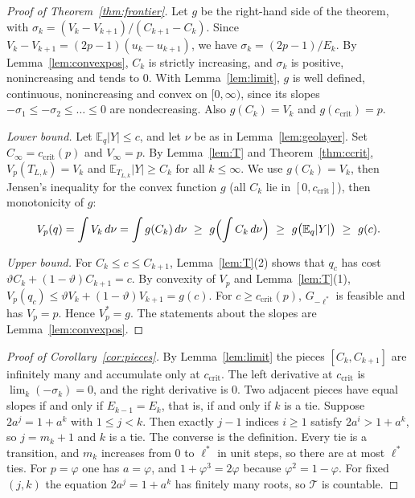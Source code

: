 \documentclass{article}
\theoremstyle{definition}
\theoremstyle{remark}
\newcommand{\E}{\mathbb{E}}
\newcommand{\ccrit}{c_{\mathrm{crit}}}
\begin{document}
\begin{proof}[Proof of Theorem~\ref{thm:frontier}]
Let \(g\) be the right-hand side of the theorem, with \(\sigma_k=(V_k-V_{k+1})/(C_{k+1}-C_k)\). Since \(V_k-V_{k+1}=(2p-1)(u_k-u_{k+1})\), we have \(\sigma_k=(2p-1)/E_k\). By Lemma~\ref{lem:convexpos}, \(C_k\) is strictly increasing, and \(\sigma_k\) is positive, nonincreasing and tends to \(0\). With Lemma~\ref{lem:limit}, \(g\) is well defined, continuous, nonincreasing and convex on \([0,\infty)\), since its slopes \(-\sigma_1\le-\sigma_2\le\dots\le0\) are nondecreasing. Also \(g(C_k)=V_k\) and \(g(\ccrit)=p\).

\emph{Lower bound.} Let \(\E_q|Y|\le c\), and let \(\nu\) be as in Lemma~\ref{lem:geolayer}. Set \(C_\infty=\ccrit(p)\) and \(V_\infty=p\). By Lemma~\ref{lem:T} and Theorem~\ref{thm:ccrit}, \(V_p(T_{L,k})=V_k\) and \(\E_{T_{L,k}}|Y|\ge C_k\) for all \(k\le\infty\). We use \(g(C_k)=V_k\), then Jensen's inequality for the convex function \(g\) (all \(C_k\) lie in \([0,\ccrit]\)), then monotonicity of \(g\):
\[
V_p(q)=\int V_k\,d\nu=\int g(C_k)\,d\nu\ \ge\ g\Bigl(\int C_k\,d\nu\Bigr)\ \ge\ g\bigl(\E_q|Y|\bigr)\ \ge\ g(c).
\]

\emph{Upper bound.} For \(C_k\le c\le C_{k+1}\), Lemma~\ref{lem:T}(2) shows that \(q_c\) has cost \(\vartheta C_k+(1-\vartheta)C_{k+1}=c\). By convexity of \(V_p\) and Lemma~\ref{lem:T}(1), \(V_p(q_c)\le\vartheta V_k+(1-\vartheta)V_{k+1}=g(c)\). For \(c\ge\ccrit(p)\), \(G_{-\ell^*}\) is feasible and has \(V_p=p\). Hence \(V_p^*=g\). The statements about the slopes are Lemma~\ref{lem:convexpos}.
\end{proof}

\begin{proof}[Proof of Corollary~\ref{cor:pieces}]
By Lemma~\ref{lem:limit} the pieces \([C_k,C_{k+1}]\) are infinitely many and accumulate only at \(\ccrit\). The left derivative at \(\ccrit\) is \(\lim_k(-\sigma_k)=0\), and the right derivative is \(0\). Two adjacent pieces have equal slopes if and only if \(E_{k-1}=E_k\), that is, if and only if \(k\) is a tie. Suppose \(2a^j=1+a^k\) with \(1\le j<k\). Then exactly \(j-1\) indices \(i\ge1\) satisfy \(2a^i>1+a^k\), so \(j=m_k+1\) and \(k\) is a tie. The converse is the definition. Every tie is a transition, and \(m_k\) increases from \(0\) to \(\ell^*\) in unit steps, so there are at most \(\ell^*\) ties. For \(p=\varphi\) one has \(a=\varphi\), and \(1+\varphi^3=2\varphi\) because \(\varphi^2=1-\varphi\). For fixed \((j,k)\) the equation \(2a^j=1+a^k\) has finitely many roots, so \(\mathcal T\) is countable.
\end{proof}
\end{document}
